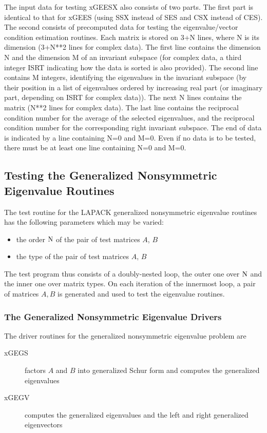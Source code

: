 The input data for testing xGEESX also consists of two parts. The first
part is identical to that for xGEES (using SSX instead of SES and CSX
instead of CES). The second consists of precomputed data for testing
the eigenvalue/vector condition estimation routines.
Each matrix is stored on 3+N lines, where N is its
dimension (3+N**2 lines for complex data).
The first line contains the dimension N
and the dimension M of an invariant subspace
(for complex data, a third integer ISRT indicating how
the data is sorted is also provided). The
second line contains M integers, identifying the
eigenvalues in the invariant subspace (by their
position in a list of eigenvalues ordered by
increasing real part (or imaginary part, depending on ISRT for
complex data)). The next N lines contains
the matrix (N**2 lines for complex data). The last line contains
the reciprocal
condition number for the average of the selected
eigenvalues, and the reciprocal condition number
for the corresponding right invariant subspace.
The end of data is indicated by a line containing
N=0 and M=0.
Even if no data is to be tested, there must be
at least one line containing N=0 and M=0.

\subsection{Testing the Generalized Nonsymmetric Eigenvalue Routines}

\dent
The test routine for the LAPACK
generalized nonsymmetric eigenvalue routines
has the following parameters which may be varied:
\begin{itemize}
\item	the order ${\rm N}$ of the pair of test matrices $A$, $B$
\item	the type of the pair of test matrices $A$, $B$
\end{itemize}
\begin{sloppypar}
\noindent
The test program thus consists of a doubly-nested
loop, the outer one over
${\rm N}$ and the inner one over matrix types.
On each iteration of the innermost loop,
a pair of matrices $A, B$ is generated and used
to test the eigenvalue routines.
\end{sloppypar}

\subsubsection{The Generalized Nonsymmetric Eigenvalue Drivers}

The driver routines for the generalized nonsymmetric eigenvalue problem
are
\begin{description}
\item[xGEGS] factors $A$ and $B$ into generalized Schur form and
computes the generalized eigenvalues
\item[xGEGV] computes the generalized eigenvalues and the left and right
generalized eigenvectors
\end{description}


